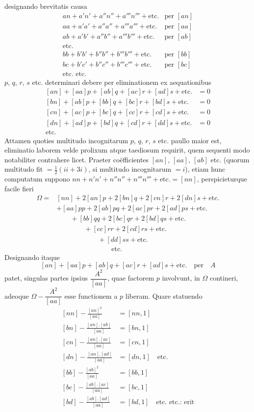 designando brevitatis causa
\[
\begin{array}{ll}
an+a'n'+a''n''+a'''n'''+\text{etc.}&\text{per }[an]\\
aa+a'a'+a''a''+a'''a'''+\text{etc.}&\text{per }[aa]\\
ab+a'b'+a''b''+a'''b'''+\text{etc.}&\text{per }[ab]\\
\text{etc.}&\\
bb+b'b'+b''b''+b'''b'''+\text{etc.}&\text{per }[bb]\\
bc+b'c'+b''c''+b'''c'''+\text{etc.}&\text{per }[bc]\\
\text{etc. etc.}&
\end{array}
\]
$p$, $q$, $r$, $s$ etc. determinari debere per eliminationem ex aequationibus
\[
\begin{aligned}{}
[an]+[aa]p+[ab]q+[ac]r+[ad]s+\text{etc.}&=0\\
[bn]+[ab]p+[bb]q+[bc]r+[bd]s+\text{etc.}&=0\\
[cn]+[ac]p+[bc]q+[cc]r+[cd]s+\text{etc.}&=0\\
[dn]+[ad]p+[bd]q+[cd]r+[dd]s+\text{etc.}&=0\\
\text{etc.}&
\end{aligned}
\]
Attamen quoties multitudo incognitarum $p$, $q$, $r$, $s$ etc. paullo maior est, eliminatio laborem velde prolixum atque taediosum requirit, quem sequenti modo notabiliter contrahere licet. Praeter coëfficientes $[an]$, $[aa]$, $[ab]$ etc. (quorum multitudo fit $=\tfrac12(ii+3i)$, si multitudo incognitarum $=i$), etiam hunc computatum suppono $nn+n'n'+n''n''+n'''n'''+\text{etc.}=[nn]$, perspicieturque facile fieri
\[
\begin{aligned}
\Omega={}&[nn]+2[an]p+2[bn]q+2[cn]r+2[dn]s+\text{etc.}\\
&+[aa]pp+2[ab]pq+2[ac]pr+2[ad]ps+\text{etc.}\\
&\qquad+[bb]qq+2[bc]qr+2[bd]qs+\text{etc.}\\
&\qquad\qquad+[cc]rr+2[cd]rs+\text{etc.}\\
&\qquad\qquad\qquad+[dd]ss+\text{etc.}\\
&\qquad\qquad\qquad\qquad\text{etc.}
\end{aligned}
\]
Designando itaque
\[
[an]+[aa]p+[ab]q+[ac]r+[ad]s+\text{etc.}\quad\text{per}\quad A
\]
patet, singulas partes ipsius $\dfrac{A^2}{[aa]}$, quae factorem $p$ involvunt, in $\Omega$ contineri, adeoque $\Omega-\dfrac{A^2}{[aa]}$ esse functionem a $p$ liberam. Quare statuendo
\[
\begin{aligned}{}
[nn]-\frac{[an]^2}{[aa]}&=[nn,1]\\
[bn]-\frac{[an].[ab]}{[aa]}&=[bn,1]\\
[cn]-\frac{[an].[ac]}{[aa]}&=[cn,1]\\
[dn]-\frac{[an].[ad]}{[aa]}&=[dn,1]\quad\text{etc.}\\
[bb]-\frac{[ab]^2}{[aa]}&=[bb,1]\\
[bc]-\frac{[ab].[ac]}{[aa]}&=[bc,1]\\
[bd]-\frac{[ab].[ad]}{[aa]}&=[bd,1]\quad\text{etc. etc.: erit}
\end{aligned}
\]
